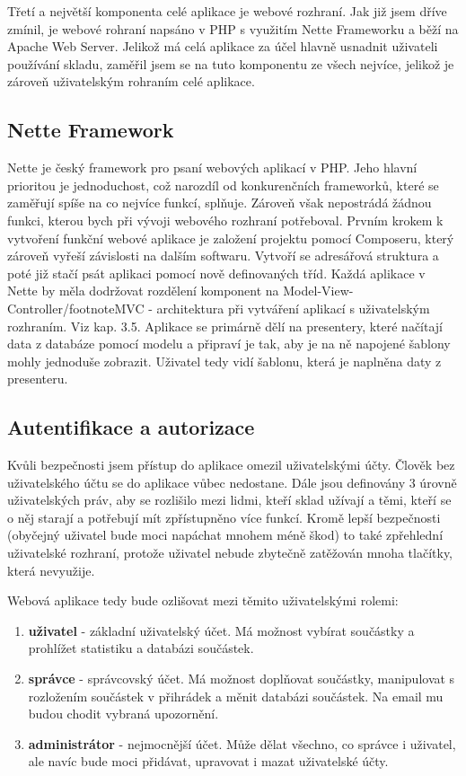 \documentclass[12pt, a4paper, oneside]{article}
\begin{document}
Třetí a největší komponenta celé aplikace je webové rozhraní. Jak již jsem dříve zmínil, je webové rohraní napsáno v PHP s využitím Nette Frameworku a běží na Apache Web Server. Jelikož má celá aplikace za účel hlavně usnadnit uživateli používání skladu, zaměřil jsem se na tuto komponentu ze všech nejvíce, jelikož je zároveň uživatelským rohraním celé aplikace.

\subsection{Nette Framework}

Nette je český framework pro psaní webových aplikací v PHP. Jeho hlavní prioritou je jednoduchost, což narozdíl od konkurenčních frameworků, které se zaměřují spíše na co nejvíce funkcí, splňuje. Zároveň však nepostrádá žádnou funkci, kterou bych při vývoji webového rozhraní potřeboval. Prvním krokem k vytvoření funkční webové aplikace je založení projektu pomocí Composeru, který zároveň vyřeší závislosti na dalším softwaru. Vytvoří se adresářová struktura a poté již stačí psát aplikaci pomocí nově definovaných tříd. Každá aplikace v Nette by měla dodržovat rozdělení komponent na Model-View-Controller/footnote{MVC - architektura při vytváření aplikací s uživatelským rozhraním. Viz kap. 3.5}. Aplikace se primárně dělí na presentery, které načítají data z databáze pomocí modelu a připraví je tak, aby je na ně napojené šablony mohly jednoduše zobrazit. Uživatel tedy vidí šablonu, která je naplněna daty z presenteru.

\subsection{Autentifikace a autorizace}

Kvůli bezpečnosti jsem přístup do aplikace omezil uživatelskými účty. Člověk bez uživatelského účtu se do aplikace vůbec nedostane. Dále jsou definovány 3 úrovně uživatelských práv, aby se rozlišilo mezi lidmi, kteří sklad užívají a těmi, kteří se o něj starají a potřebují mít zpřístupněno více funkcí. Kromě lepší bezpečnosti (obyčejný uživatel bude moci napáchat mnohem méně škod) to také zpřehlední uživatelské rozhraní, protože uživatel nebude zbytečně zatěžován mnoha tlačítky, která nevyužije.

Webová aplikace tedy bude ozlišovat mezi těmito uživatelskými rolemi:

\begin{enumerate}
\item \textbf{uživatel} - základní uživatelský účet. Má možnost vybírat součástky a prohlížet statistiku a databázi součástek.
\item \textbf{správce} - správcovský účet. Má možnost doplňovat součástky, manipulovat s rozložením součástek v přihrádek a měnit databázi součástek. Na email mu budou chodit vybraná upozornění.
\item \textbf{administrátor} - nejmocnější účet. Může dělat všechno, co správce i uživatel, ale navíc bude moci přidávat, upravovat i mazat uživatelské účty.
\end{enumerate}
\end{document}
